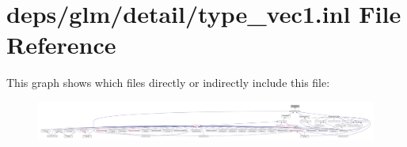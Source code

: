 \hypertarget{type__vec1_8inl}{}\section{deps/glm/detail/type\+\_\+vec1.inl File Reference}
\label{type__vec1_8inl}
This graph shows which files directly or indirectly include this file\+:
\nopagebreak
\begin{figure}[H]
\begin{center}
\leavevmode
\includegraphics[width=350pt]{d8/dfe/type__vec1_8inl__dep__incl}
\end{center}
\end{figure}
